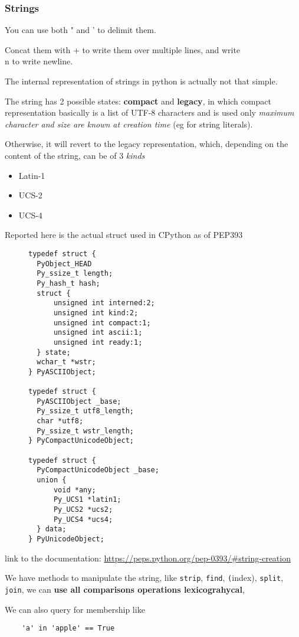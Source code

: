 \documentclass[10pt, openany]{article}
\begin{document}
  \subsubsection{Strings}
  You can use both " and ' to delimit them.\par
  Concat them with + to write them over multiple lines, and write 
  \\n to write newline.\par
  The internal representation of strings in python is actually not 
  that simple.\par
  The string has 2 possible states: \textbf{compact} and 
  \textbf{legacy}, in which compact representation basically is a 
  list of UTF-8 characters and is used only \textit{maximum character
  and size are known at creation time} (eg for string literals).\par
  Otherwise, it will revert to the legacy representation, which, 
  depending on the content of the string, can be of 3 \textit{kinds}
  \begin{itemize}[noitemsep, topsep=0pt]
    \item Latin-1
    \item UCS-2
    \item UCS-4
  \end{itemize}
  Reported here is the actual struct used in CPython as of PEP393
  \begin{figure}[H]
  \captionsetup{labelformat=empty}  %
  \begin{lstlisting}
typedef struct {
  PyObject_HEAD
  Py_ssize_t length;
  Py_hash_t hash;
  struct {
      unsigned int interned:2;
      unsigned int kind:2;
      unsigned int compact:1;
      unsigned int ascii:1;
      unsigned int ready:1;
  } state;
  wchar_t *wstr;
} PyASCIIObject;

typedef struct {
  PyASCIIObject _base;
  Py_ssize_t utf8_length;
  char *utf8;
  Py_ssize_t wstr_length;
} PyCompactUnicodeObject;

typedef struct {
  PyCompactUnicodeObject _base;
  union {
      void *any;
      Py_UCS1 *latin1;
      Py_UCS2 *ucs2;
      Py_UCS4 *ucs4;
  } data;
} PyUnicodeObject;
  \end{lstlisting}
  \end{figure}
  link to the documentation: \url{https://peps.python.org/pep-0393/#string-creation}\par
  
  We have methods to manipulate the string, like \texttt{strip}, 
  \texttt{find}, \texttt(index), \texttt{split}, \texttt{join},
  we can \textbf{use all comparisons operations lexicograhycal},
  \par
  We can also query for membership like
  \begin{lstlisting}
    'a' in 'apple' == True
  \end{lstlisting}
  
\end{document}
